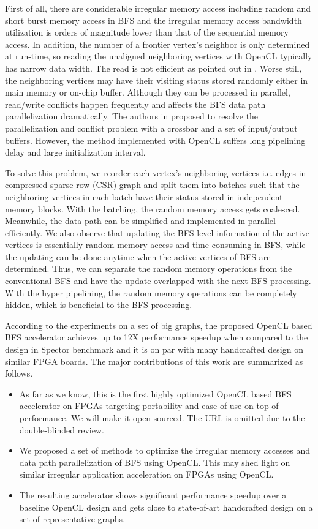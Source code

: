 First of all, there are considerable irregular memory access including 
random and short burst memory access in BFS and the irregular memory access 
bandwidth utilization is orders of magnitude lower than that of the sequential 
memory access. In addition, the number of a 
frontier vertex's neighbor is only determined at run-time, so reading the unaligned 
neighboring vertices with OpenCL typically has narrow data width. The read is not efficient 
as pointed out in \cite{wang2017multikernel}. Worse still, the neighboring vertices 
may have their visiting status stored randomly either in main memory or on-chip buffer.
Although they can be processed in parallel, read/write conflicts happen frequently 
and affects the BFS data path parallelization dramatically. 
The authors in \cite{ham2016graphicionado} 
proposed to resolve the parallelization and conflict problem with a 
crossbar and a set of input/output buffers. However, the method implemented 
with OpenCL suffers long pipelining delay and large initialization interval. 

To solve this problem, we reorder each vertex's neighboring vertices i.e. 
edges in compressed sparse row (CSR) graph and split them into 
batches such that the neighboring vertices 
in each batch have their status stored in independent memory blocks. 
With the batching, the random memory access gets coalesced. Meanwhile, 
the data path can be simplified and implemented in parallel efficiently. 
We also observe that updating the BFS level information of the 
active vertices is essentially random memory access and time-consuming 
in BFS, while the updating can be done anytime when the active vertices of BFS 
are determined. Thus, we can separate the random memory operations from
the conventional BFS and have the update overlapped with the next BFS processing. 
With the hyper pipelining, the random memory operations can be completely 
hidden, which is beneficial to the BFS processing.

According to the experiments on a set of big graphs, the proposed OpenCL based BFS 
accelerator achieves up to 12X performance speedup when compared to the design 
in Spector benchmark and it is on par with many handcrafted design on similar FPGA boards. 
The major contributions of this work are summarized as follows.
\begin{itemize}
    \item As far as we know, this is the first highly optimized  
		OpenCL based BFS accelerator on FPGAs targeting portability and ease of 
		use on top of performance. We will make it open-sourced. The URL is 
		omitted due to the double-blinded review. 
    \item We proposed a set of methods to optimize the irregular
		memory accesses and data path parallelization of BFS using OpenCL. 
		This may shed light on similar irregular application acceleration on 
		FPGAs using OpenCL.
    \item The resulting accelerator shows significant performance speedup 
        over a baseline OpenCL design and gets close to state-of-art handcrafted 
		design on a set of representative graphs.
\end{itemize}

